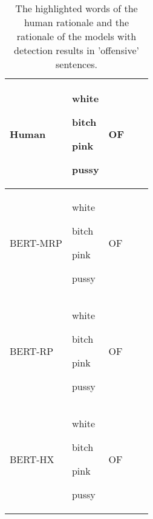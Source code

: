 \documentclass[11pt]{article}
\begin{document}
\begin{table*}[!b]
{\begin{tabular}{lllll}
Human & {\begingroup\setlength{\fboxsep}{1pt} \colorbox{red!66.66666666666666}{\strut white} \colorbox{red!66.66666666666666}{\strut bitch} \colorbox{red!66.66666666666666}{\strut pink} \colorbox{red!66.66666666666666}{\strut pussy}   \endgroup} & OF \\ 
\hline
BERT-MRP & {\begingroup\setlength{\fboxsep}{1pt} \colorbox{red!22}{\strut white} \colorbox{red!100}{\strut bitch} \colorbox{red!0}{\strut pink} \colorbox{red!7}{\strut pussy}   \endgroup} & OF \\
BERT-RP & {\begingroup\setlength{\fboxsep}{1pt} \colorbox{red!0}{\strut white} \colorbox{red!100}{\strut bitch} \colorbox{red!3}{\strut pink} \colorbox{red!2}{\strut pussy}   \endgroup} & OF \\
BERT-HX & {\begingroup\setlength{\fboxsep}{1pt}  \colorbox{red!0}{\strut white} \colorbox{red!100}{\strut bitch} \colorbox{red!0}{\strut pink} \colorbox{red!42}{\strut pussy}   \endgroup} & OF \\

\hline
\end{tabular}
\caption{The highlighted words of the human rationale and the rationale of the models with detection results in 'offensive' sentences. }
\label{offensive_appendix}
}
\end{table*}
\end{document}
